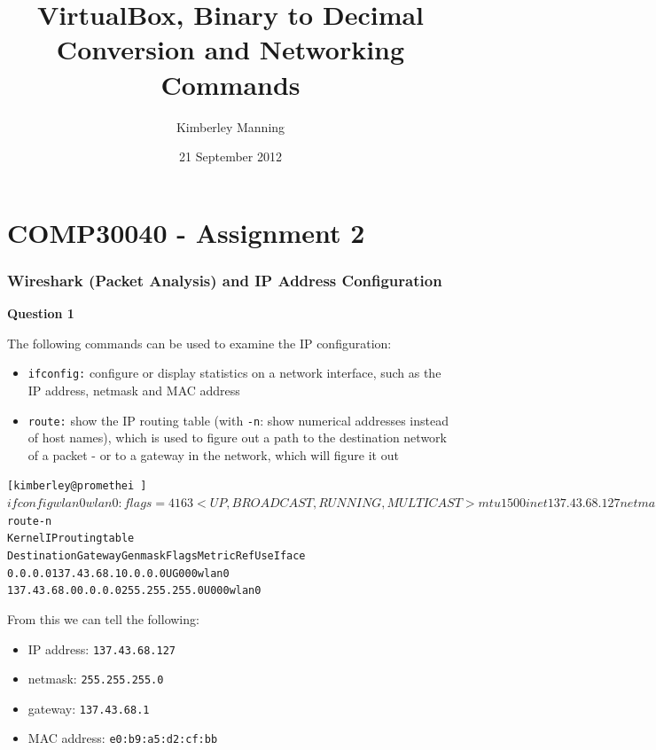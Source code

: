 \documentclass[a4paper,12pt]{report}
\begin{document}
\title{VirtualBox, Binary to Decimal Conversion and Networking Commands}
\author{Kimberley Manning}
\date{21 September 2012}
\newpage

\section*{COMP30040 - Assignment 2}

\subsubsection*{Wireshark (Packet Analysis) and IP Address Configuration}

\textbf{Question 1}

The following commands can be used to examine the IP configuration:

\begin{itemize}
\item \verb=ifconfig:= configure or display statistics on a network interface, such as the IP address, netmask and MAC address
\item \verb=route:= show the IP routing table (with \verb=-n=: show numerical addresses instead of host names), which is used to figure out a path to the destination network of a packet - or to a gateway in the network, which will figure it out
\end{itemize}

\begin{alltt}
[kimberley@promethei ~]$ ifconfig wlan0
wlan0: flags=4163<UP,BROADCAST,RUNNING,MULTICAST>  mtu 1500
inet 137.43.68.127  netmask 255.255.255.0  broadcast 137.43.68.255
inet6 fe80::2b9:a5ff:fed2:cfbb  prefixlen 64  scopeid 0x20<link>
ether e0:b9:a5:d2:cf:bb  txqueuelen 1000  (Ethernet)
RX packets 11769  bytes 5844746 (5.5 MiB)
RX errors 0  dropped 0  overruns 0  frame 0
TX packets 8188  bytes 1260157 (1.2 MiB)
TX errors 0  dropped 0 overruns 0  carrier 0  collisions 0

[kimberley@promethei ~]$ route -n
Kernel IP routing table
Destination     Gateway         Genmask         Flags Metric Ref    Use Iface
0.0.0.0         137.43.68.1     0.0.0.0         UG    0      0        0 wlan0
137.43.68.0     0.0.0.0         255.255.255.0   U     0      0        0 wlan0

\end{alltt}

From this we can tell the following:

\begin{itemize}
\item IP address: \verb=137.43.68.127=
\item netmask: \verb=255.255.255.0=
\item gateway: \verb=137.43.68.1=
\item MAC address: \verb=e0:b9:a5:d2:cf:bb=
\end{itemize}
\end{document}
